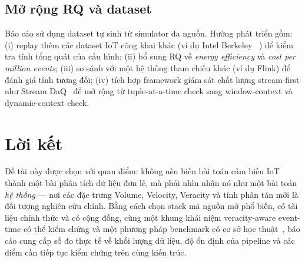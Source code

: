\subsection{Mở rộng RQ và dataset}

Báo cáo sử dụng dataset tự sinh từ simulator đa nguồn. Hướng phát triển gồm:
(i) replay thêm các dataset IoT công khai khác (ví dụ Intel Berkeley
~\cite{intel_berkeley_dataset}) để kiểm tra tính tổng quát của cấu hình;
(ii) bổ sung RQ về \emph{energy efficiency} và \emph{cost per million events};
(iii) so sánh với một hệ thống tham chiếu khác (ví dụ Flink) để đánh giá tính
tương đối; (iv) tích hợp framework giám sát chất lượng stream-first như
Stream DaQ~\cite{stream_daq_2024} để mở rộng từ tuple-at-a-time check sang
window-context và dynamic-context check.

\section{Lời kết}

Đề tài này được chọn với quan điểm: không nên biến bài toán cảm biến IoT
thành một bài phân tích dữ liệu đơn lẻ, mà phải nhìn nhận nó như một bài toán
\emph{hệ thống} --- nơi các đặc trưng Volume, Velocity, Veracity và tính phân
tán mới là đối tượng nghiên cứu chính. Bằng cách chọn stack mã nguồn mở phổ
biến, có tài liệu chính thức và có cộng đồng, cùng một khung khái niệm
veracity-aware event-time có thể kiểm chứng và một phương pháp benchmark có
cơ sở học thuật~\cite{kafka_patterns_benchmark_2025, stream_daq_2024}, báo cáo
cung cấp số đo thực tế về khối lượng dữ liệu, độ ổn định của pipeline và các
điểm cần tiếp tục kiểm chứng trên cùng kiến trúc.
